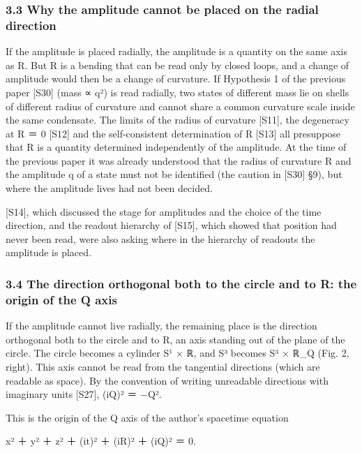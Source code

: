\documentclass[
  a4paper,
]{article}
\begin{document}
\subsubsection{3.3 Why the amplitude cannot be placed on the radial
direction}\label{why-the-amplitude-cannot-be-placed-on-the-radial-direction}

If the amplitude is placed radially, the amplitude is a quantity on the
same axis as R. But R is a bending that can be read only by closed
loops, and a change of amplitude would then be a change of curvature. If
Hypothesis 1 of the previous paper {[}S30{]} (mass ∝
\textbar q\textbar²) is read radially, two states of different mass lie
on shells of different radius of curvature and cannot share a common
curvature scale inside the same condensate. The limits of the radius of
curvature {[}S11{]}, the degeneracy at R ＝ 0 {[}S12{]} and the
self-consistent determination of R {[}S13{]} all presuppose that R is a
quantity determined independently of the amplitude. At the time of the
previous paper it was already understood that the radius of curvature R
and the amplitude \textbar q\textbar{} of a state must not be identified
(the caution in {[}S30{]} §9), but where the amplitude lives had not
been decided.

{[}S14{]}, which discussed the stage for amplitudes and the choice of
the time direction, and the readout hierarchy of {[}S15{]}, which showed
that position had never been read, were also asking where in the
hierarchy of readouts the amplitude is placed.

\subsubsection{3.4 The direction orthogonal both to the circle and to R:
the origin of the Q
axis}\label{the-direction-orthogonal-both-to-the-circle-and-to-r-the-origin-of-the-q-axis}

If the amplitude cannot live radially, the remaining place is the
direction orthogonal both to the circle and to R, an axis standing out
of the plane of the circle. The circle becomes a cylinder S¹ × ℝ, and S³
becomes S³ × ℝ\_Q (Fig. 2, right). This axis cannot be read from the
tangential directions (which are readable as space). By the convention
of writing unreadable directions with imaginary units {[}S27{]}, (iQ)²
＝ −Q².

This is the origin of the Q axis of the author's spacetime equation

x² ＋ y² ＋ z² ＋ (it)² ＋ (iR)² ＋ (iQ)² ＝ 0.
\end{document}
